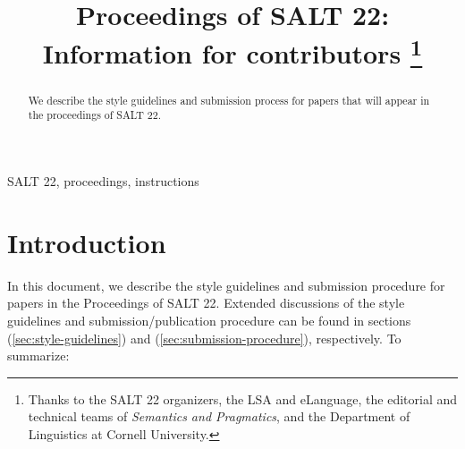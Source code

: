 \documentclass{salt}
\title[SALT 22 proceedings information]{Proceedings of SALT 22: \\ Information for contributors%
  \thanks{Thanks to the SALT 22 organizers, the LSA and eLanguage, the editorial and technical teams of \emph{Semantics and Pragmatics}, and the Department of Linguistics at Cornell University.}}
\author[Chereches, Ashton, and Lutz]{%
  \saltauthor{Anca Chereches \\ \institute{Cornell University}} \AND
  \saltauthor{Neil Ashton \\ \institute{Cornell University}} \AND
  \saltauthor{David Lutz \\ \institute{Cornell University}}%
}
\begin{document}

\maketitle

%
\setcounter{page}{1}
%
%

\begin{abstract}  
  We describe the style guidelines and submission process for papers that will appear in the proceedings of SALT 22.
\end{abstract}

\begin{keywords}
  SALT 22, proceedings, instructions
\end{keywords}

\tableofcontents

\section{Introduction}\label{sec:introduction}

In this document, we describe the style guidelines and submission procedure for papers in the Proceedings of SALT 22. Extended discussions of the style guidelines and submission/publication procedure can be found in sections (\ref{sec:style-guidelines}) and (\ref{sec:submission-procedure}), respectively.  To summarize:
\end{document}
